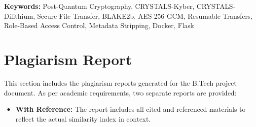 \documentclass[12pt,a4paper]{report}
\theoremstyle{definition} %
\begin{document}
\vspace*{12pt}
\noindent \textbf{Keywords:} Post-Quantum Cryptography, CRYSTALS-Kyber, CRYSTALS-Dilithium, Secure File Transfer, BLAKE2b, AES-256-GCM, Resumable Transfers, Role-Based Access Control, Metadata Stripping, Docker, Flask



	\clearpage
{}

\renewcommand*\contentsname{Table of Contents}
\tableofcontents

\clearpage
{}
\listoffigures

\clearpage
{}
\listofalgorithms

\clearpage
\pagestyle{fancy}
\fancyhf{}
\rhead{\thepage}
\lhead{}
\setcounter{page}{1}










\lhead{}
\newpage 
\appendix



\clearpage
\chapter*{Plagiarism Report}

This section includes the plagiarism reports generated for the B.Tech project document. As per academic requirements, two separate reports are provided:

\begin{itemize}
    \item \textbf{With Reference:} The report includes all cited and referenced materials to reflect the actual similarity index in context.
\end{itemize}
\end{document}
